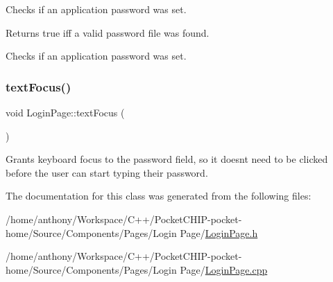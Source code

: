 Checks if an application password was set.

\begin{DoxyReturn}{Returns}
true iff a valid password file was found.
\end{DoxyReturn}
Checks if an application password was set. \mbox{\label{classLoginPage_a9ff7597fd0d491c61ab8b5a4f4a7bd40}} 
\subsubsection{\texorpdfstring{text\+Focus()}{textFocus()}}
{\footnotesize\ttfamily void Login\+Page\+::text\+Focus (\begin{DoxyParamCaption}{ }\end{DoxyParamCaption})\hspace{0.3cm}{\ttfamily [virtual]}}

Grants keyboard focus to the password field, so it doesn\textquotesingle{}t need to be clicked before the user can start typing their password. 

The documentation for this class was generated from the following files\+:\begin{DoxyCompactItemize}
\item 
/home/anthony/\+Workspace/\+C++/\+Pocket\+C\+H\+I\+P-\/pocket-\/home/\+Source/\+Components/\+Pages/\+Login Page/\mbox{\hyperlink{LoginPage_8h}{Login\+Page.\+h}}\item 
/home/anthony/\+Workspace/\+C++/\+Pocket\+C\+H\+I\+P-\/pocket-\/home/\+Source/\+Components/\+Pages/\+Login Page/\mbox{\hyperlink{LoginPage_8cpp}{Login\+Page.\+cpp}}\end{DoxyCompactItemize}
